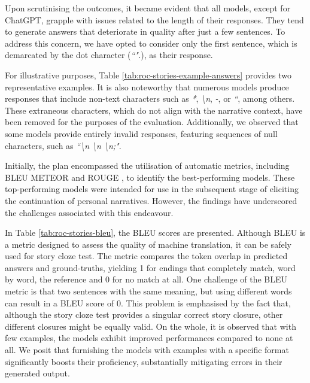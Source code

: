 Upon scrutinising the outcomes, it became evident that all models, except for ChatGPT, grapple with issues related to the length of their responses. They tend to generate answers that deteriorate in quality after just a few sentences. To address this concern, we have opted to consider only the first sentence, which is demarcated by the dot character (\emph{``".}), as their response.

For illustrative purposes, Table \ref{tab:roc-stories-example-answers} provides two representative examples. It is also noteworthy that numerous models produce responses that include non-text characters such as \emph{*}, \emph{\textbackslash n}, \emph{-}, or \emph{``}, among others. These extraneous characters, which do not align with the narrative context, have been removed for the purposes of the evaluation. Additionally, we observed that some models provide entirely invalid responses, featuring sequences of null characters, such as \emph{``\textbackslash n \textbackslash n \textbackslash n;"}. %

% 

Initially, the plan encompassed the utilisation of automatic metrics, including BLEU \cite{bleu} METEOR \cite{meteor} and ROUGE \cite{rouge}, to identify the best-performing models. These top-performing models were intended for use in the subsequent stage of eliciting the continuation of personal narratives. However, the findings have underscored the challenges associated with this endeavour.

% 
% 
In Table \ref{tab:roc-stories-bleu}, the BLEU scores are presented. Although BLEU is a metric designed to assess the quality of machine translation, it can be safely used for story cloze test. The metric compares the token overlap in predicted answers and ground-truths, yielding 1 for endings that completely match, word by word, the reference and 0 for no match at all. One challenge of the BLEU metric is that two sentences with the same meaning, but using different words can result in a BLEU score of 0. This problem is emphasised by the fact that, although the story cloze test provides a singular correct story closure, other different closures might be equally valid. 
On the whole, it is observed that with few examples, the models exhibit improved performances compared to none at all. We posit that furnishing the models with examples with a specific format significantly boosts their proficiency, substantially mitigating errors in their generated output.

